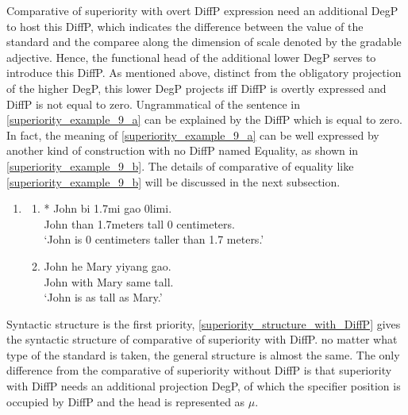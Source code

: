 \documentclass{ctexart}
\begin{document}
Comparative of superiority with overt DiffP expression need an additional DegP to host this DiffP, which indicates the difference between the value of the standard and the comparee along the dimension of scale denoted by the gradable adjective. Hence, the functional head of the additional lower DegP serves to introduce this DiffP. As mentioned above, distinct from the obligatory projection of the higher DegP, this lower DegP projects iff DiffP is overtly expressed and DiffP is not equal to zero. Ungrammatical of the sentence in \ref{superiority_example_9_a} can be explained by the DiffP which is equal to zero. In fact, the meaning of \ref{superiority_example_9_a} can be well expressed by another kind of construction with no DiffP named Equality, as shown in \ref{superiority_example_9_b}. The details of comparative of equality like \ref{superiority_example_9_b} will be discussed in the next subsection.

\begin{enumerate}
    \item \label{superiority_example_9}
    \begin{enumerate}
        \item \label{superiority_example_9_a}
        * John bi \enspace \enspace 1.7mi \enspace \enspace \enspace \enspace gao \enspace \enspace 0limi. \\
        \hspace*{0.5em} John than 1.7meters tall 0 centimeters. \\
        \hspace*{0.5em} `John is 0 centimeters taller than 1.7 meters.'

        \item \label{superiority_example_9_b}
        John he Mary yiyang gao. \\
        John with Mary same tall.  \\
        `John is as tall as Mary.'

    \end{enumerate}
\end{enumerate}

Syntactic structure is the first priority, \ref{superiority_structure_with_DiffP} gives the syntactic structure of comparative of superiority with DiffP. no matter what type of the standard is taken, the general structure is almost the same. The only difference from the comparative of superiority without DiffP is that superiority with DiffP needs an additional projection DegP, of which the specifier position is occupied by DiffP and the head is represented as $\mu$.
\end{document}
